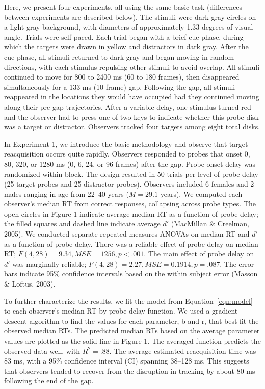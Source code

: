 \documentclass[doc]{apa}
\newcommand{\MSE}{\ensuremath{\mathit{MSE}}}
\begin{document}
Here, we present four experiments, all using the same basic task
(differences between experiments are described below).  The stimuli were
dark gray circles on a light gray background, with diameters of
approximately 1.33 degrees of visual angle.  Trials were self-paced.  Each
trial began with a brief cue phase, during which the targets were drawn in
yellow and distractors in dark gray.  After the cue phase, all stimuli
returned to dark gray and began moving in random directions, with each
stimulus repulsing other stimuli to avoid overlap.  All stimuli continued
to move for 800 to 2400 ms (60 to 180 frames), then disappeared
simultaneously for a 133 ms (10 frame) gap.  Following the gap, all stimuli
reappeared in the locations they would have occupied had they continued
moving along their pre-gap trajectories.  After a variable delay, one
stimulus turned red and the observer had to press one of two keys to
indicate whether this probe disk was a target or distractor.  Observers
tracked four targets among eight total disks.

In Experiment 1, we introduce the basic methodology and observe that target
reacquisition occurs quite rapidly.  Observers responded to probes that
onset 0, 80, 320, or 1280 ms (0, 6, 24, or 96 frames) after the gap.  Probe
onset delay was randomized within block.  The design resulted in 50 trials
per level of probe delay (25 target probes and 25 distractor probes).
Observers included 6 females and 2 males ranging in age from 22--40 years
($M = 29.1$ years).  We computed each observer's median RT from correct
responses, collapsing across probe types.  The open circles in Figure 1
indicate average median RT as a function of probe delay; the filled squares
and dashed line indicate average $d'$ (MacMillan \& Creelman, 2005).  We
conducted separate repeated measures ANOVAs on median RT and $d'$ as a
function of probe delay.  There was a reliable effect of probe delay on
median RT; $F(4,28) = 9.34, \MSE = 1256, p < .001$.  The main effect of
probe delay on $d'$ was marginally reliable; $F(4, 28) = 2.27, \MSE =
0.1914, p = .087$.  The error bars indicate 95\% confidence intervals based
on the within subject error (Masson \& Loftus, 2003).

To further characterize the results, we fit the model from
Equation~\ref{eqn:model} to each observer's median RT by probe delay
function.  We used a gradient descent algorithm to find the values for each
parameter, b and r, that best fit the observed median RTs.  The predicted
median RTs based on the average parameter values are plotted as the solid
line in Figure 1.  The averaged function predicts the observed data well,
with $R^2 = .88$.  The average estimated reacquisition time was 83 ms, with
a 95\% confidence interval (CI) spanning 38--128 ms.  This suggests that
observers tended to recover from the disruption in tracking by about 80 ms
following the end of the gap.
\end{document}
